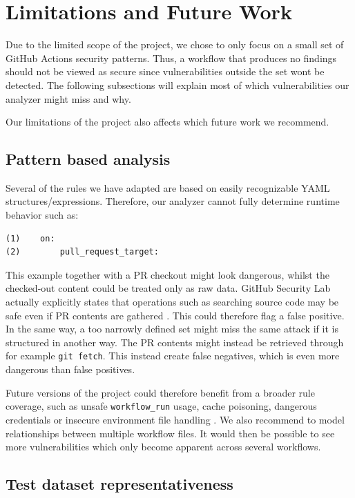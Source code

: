 \documentclass{article}
\begin{document}
\section{Limitations and Future Work}

Due to the limited scope of the project, we chose to only focus on a small set of GitHub Actions security patterns. Thus, a workflow that produces no findings should not be viewed as secure since vulnerabilities outside the set wont be detected. The following subsections will explain most of which vulnerabilities our analyzer might miss and why. 

Our limitations of the project also affects which future work we recommend. 

\subsection{Pattern based analysis}

Several of the rules we have adapted are based on easily recognizable YAML structures/expressions. Therefore, our analyzer cannot fully determine runtime behavior such as:

\begin{verbatim}
(1)    on:
(2)        pull_request_target:
\end{verbatim}

This example together with a PR checkout might look dangerous, whilst the checked-out content could be treated only as raw data. GitHub Security Lab actually explicitly states that operations such as searching source code may be safe even if PR contents are gathered \cite{githubpwnrequests}. This could therefore flag a false positive. In the same way, a too narrowly defined set might miss the same attack if it is structured in another way. The PR contents might instead be retrieved through for example \texttt{git fetch}. This instead create false negatives, which is even more dangerous than false positives. 

Future versions of the project could therefore benefit from a broader rule coverage, such as unsafe \texttt{workflow\_run} usage, cache poisoning, dangerous credentials or insecure environment file handling \cite{githubprtarget}. We also recommend to model relationships between multiple workflow files. It would then be possible to see more vulnerabilities which only become apparent across several workflows.

\subsection{Test dataset representativeness}
\end{document}
